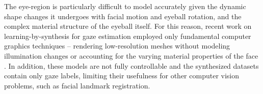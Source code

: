 
The eye-region is particularly difficult to model accurately given the dynamic shape changes it undergoes with facial motion and eyeball rotation, and the complex material structure of the eyeball itself.
For this reason, recent work on learning-by-synthesis for gaze estimation employed only fundamental computer graphics techniques -- rendering low-resolution meshes without modeling illumination changes or accounting for the varying material properties of the face \cite{sugano2014learning}.
In addition, these models are not fully controllable and the synthesized datasets contain only gaze labels, limiting their usefulness for other computer vision problems, such as facial landmark registration.





